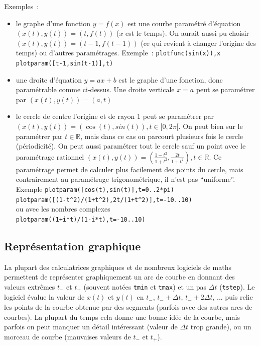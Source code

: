 \documentclass[a4paper,11pt]{article}
\newcommand{\R}{{\mathbb{R}}}
\begin{document}
Exemples~:
\begin{itemize}
\item le graphe d'une fonction $y=f(x)$ est une courbe param\'etr\'e
d'\'equation $(x(t),y(t))=(t,f(t))$ ($x$ est le temps). 
On aurait aussi pu choisir
$(x(t),y(t))=(t-1,f(t-1))$ (ce qui revient \`a changer l'origine des
temps) ou d'autres param\'etrages.
Exemple~: \verb|plotfunc(sin(x)),x| 
\verb|plotparam([t-1,sin(t-1)],t)|
\item une droite d'\'equation $y=ax+b$ est le graphe d'une fonction,
donc param\'etrable comme ci-dessus. Une droite verticale $x=a$ peut
se param\'etrer par $(x(t),y(t))=(a,t)$
\item le cercle de centre l'origine et de rayon 1 peut se param\'etrer
  par $(x(t),y(t))=(\cos(t),sin(t)), t \in [0,2\pi[$. On peut bien sur
le param\'etrer par $t \in \R$, mais dans ce cas on parcourt plusieurs
fois le cercle (p\'eriodicit\'e). On peut aussi param\'etrer tout le
cercle sauf un point avec le param\'etrage rationnel
$(x(t),y(t))=(\frac{1-t^2}{1+t^2},\frac{2t}{1+t^2}), t \in \R$. Ce
param\'etrage permet de calculer plus facilement des points
du cercle, mais contrairement au param\'etrage trigonom\'etrique,
il n'est pas ``uniforme''.\\
Exemple \verb|plotparam([cos(t),sin(t)],t=0..2*pi)|\\
\verb|plotparam([(1-t^2)/(1+t^2),2t/(1+t^2)],t=-10..10)|\\
ou avec les nombres complexes\\
\verb|plotparam((1+i*t)/(1-i*t),t=-10..10)|
\end{itemize}

\subsection{Repr\'esentation graphique} 
La plupart des calculatrices graphiques
et de nombreux logiciels de maths permettent de
repr\'esenter graphiquement un arc de courbe en donnant des valeurs
extr\^emes $t_-$ et $t_+$ (souvent not\'ees \verb|tmin| et
\verb|tmax|) et un pas $\Delta t$ (\verb|tstep|). Le logiciel \'evalue
la valeur de $x(t)$ et $y(t)$ en $t_-$, $t_-+\Delta t$, $t_-+2\Delta
t$, ... puis relie les points de la courbe obtenue par des segments
(parfois avec des autres arcs de courbes). La plupart du temps
cela donne une bonne id\'ee de la courbe, mais parfois on peut
manquer un d\'etail int\'eressant (valeur de $\Delta t$ trop
grande), ou un morceau de courbe (mauvaises
valeurs de $t_-$ et $t_+$).
\end{document}
